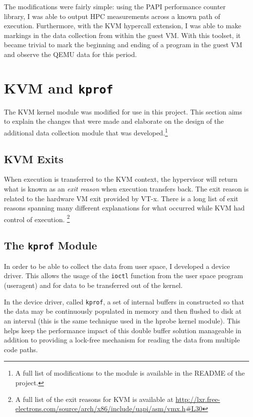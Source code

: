 \documentclass[notitlepage]{article}
\begin{document}
The modifications were fairly simple: using the PAPI performance counter
library, I was able to output HPC measurements across a known path of execution.
Furthermore, with the KVM hypercall extension, I was able to make markings in
the data collection from within the guest VM. With this toolset, it became
trivial to mark the beginning and ending of a program in the guest VM and
observe the QEMU data for this period.


\section{KVM and \texttt{kprof}}
The KVM kernel module was modified for use in this project. This section aims to
explain the changes that were made and elaborate on the design of the additional
data collection module that was developed.\footnote{A full list of modifications
to the module is available in the README of the project.}

\subsection{KVM Exits}
When execution is transferred to the KVM context, the hypervisor will return
what is known as an \textit{exit reason} when execution transfers back. The exit
reason is related to the hardware VM exit provided by VT-x. There is
a long list of exit reasons spanning many different explanations for what
occurred while KVM had control of execution. \footnote{A full list of the exit
    reasons for KVM is available at
\url{http://lxr.free-electrons.com/source/arch/x86/include/uapi/asm/vmx.h\#L30}}

\subsection{The \texttt{kprof} Module}
In order to be able to collect the data from user space, I developed a device
driver. This allows the usage of the \texttt{ioctl} function from the user space
program (useragent) and for data to be transferred out of the kernel.

In the device driver, called \texttt{kprof}, a set of internal buffers in
constructed so that the data may be continuously populated in memory and then
flushed to disk at an interval (this is the same technique used in the hprobe
kernel module).  This helps keep the performance impact of this double buffer
solution manageable in addition to providing a lock-free mechanism for reading
the data from multiple code paths.
\end{document}
